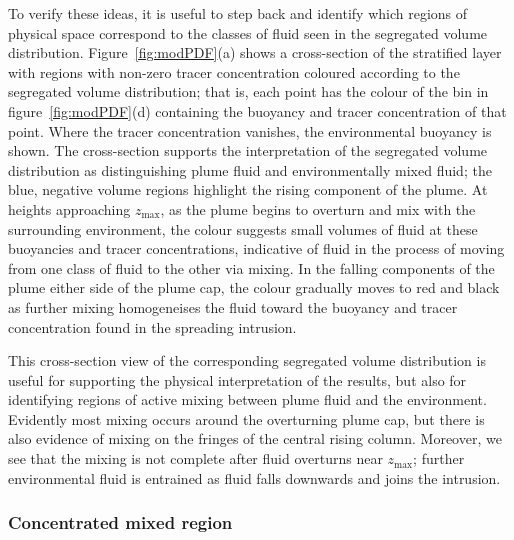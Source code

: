 \documentclass[a4paper]{article}
\begin{document}
To verify these ideas, it is useful to step back and identify which regions of physical space correspond to
the classes of fluid seen in the segregated volume distribution. Figure~\ref{fig:modPDF}(a) shows a
cross-section of the stratified layer with regions with non-zero tracer concentration coloured according to
the segregated volume distribution; that is, each point has the colour of the bin in
figure~\ref{fig:modPDF}(d) containing the buoyancy and tracer concentration of that point. Where the tracer
concentration vanishes, the environmental buoyancy is shown. The cross-section supports the interpretation of
the segregated volume distribution as distinguishing plume fluid and environmentally mixed fluid; the blue,
negative volume regions highlight the rising component of the plume. At heights approaching $z_{\max}$, as the
plume begins to overturn and mix with the surrounding environment, the colour suggests small volumes of fluid
at these buoyancies and tracer concentrations, indicative of fluid in the process of moving from one class of
fluid to the other via mixing. In the falling components of the plume either side of the plume cap, the colour
gradually moves to red and black as further mixing homogeneises the fluid toward the buoyancy and tracer
concentration found in the spreading intrusion.  

This cross-section view of the corresponding segregated volume distribution is useful for supporting the
physical interpretation of the results, but also for identifying regions of active mixing between plume fluid
and the environment. Evidently most mixing occurs around the overturning plume cap, but there is also evidence
of mixing on the fringes of the central rising column. Moreover, we see that the mixing is not complete after
fluid overturns near $z_{\max}$; further environmental fluid is entrained as fluid falls downwards and joins
the intrusion.

\subsubsection{Concentrated mixed region}
\end{document}

